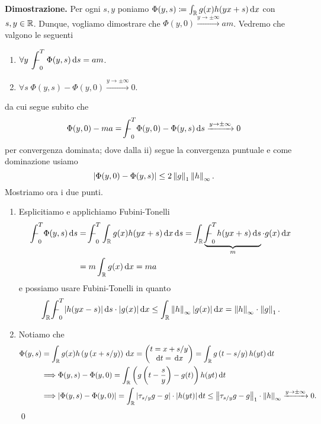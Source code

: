 \textbf{Dimostrazione.}
Per ogni $s, y$ poniamo $\Phi(y, s) \coloneqq \int_\mathbb R g(x) h(yx + s) \,\mathrm{d} x$ con $s, y \in \mathbb R$. Dunque, vogliamo dimostrare che $\Phi(y, 0) \xrightarrow{y \to \pm\infty} a m$.
Vedremo che valgono le seguenti
\begin{enumerate}
	\item $\forall y \; \ds \avint_0^T \Phi(y, s) \dd s = am$.
	\item $\forall s \; \Phi(y, s) - \Phi(y, 0) \xrightarrow{y \to \pm \infty} 0$.
\end{enumerate}
da cui segue subito che
$$
\Phi(y, 0) - ma = \avint_0^T \Phi(y, 0) - \Phi(y, s) \dd s \xrightarrow{y \to \pm \infty} 0
$$
per convergenza dominata; dove dalla ii) segue la convergenza puntuale e come dominazione usiamo
$$
	|\Phi(y, 0) - \Phi(y, s)| \leq 2 \left\lVert g \right\rVert_1 \left\lVert h \right\rVert_\infty.
$$
Mostriamo ora i due punti.
\begin{enumerate}
	\item Esplicitiamo e applichiamo Fubini-Tonelli
		$$
		\begin{aligned}
			\avint_0^T \Phi(y, s) \dd s
			&= \avint_0^T \int_\R g(x) h(yx + s) \dd x \dd s
			= \int_\R \underbrace{\avint_0^T h(yx + s) \dd s}_m \cdot g(x) \dd x \\
			&= m \int_\R g(x) \dd x = m a
		\end{aligned}
		$$
		e possiamo usare Fubini-Tonelli in quanto 
		$$
			\ds \int_\R \avint_0^T |h(yx - s)| \dd s \cdot |g(x)| \dd x \leq \int_\R \norm{h}_\infty |g(x)| \dd x = \norm{h}_\infty \cdot \norm{g}_1.
		$$

	\item Notiamo che
		\begin{align*}
			\Phi(y, s) 
			& = \int_\mathbb R g(x) h\left(y \left( x + s/y \right)\right) \,\mathrm{d} x
			= \begin{pmatrix}
				t = x + s/y \\
				\,\mathrm{d} t = \,\mathrm{d} x
			\end{pmatrix} 
			= \int_\mathbb R g \left( t - s/y \right) h(yt) \,\mathrm{d} t \\
			& \Longrightarrow \Phi(y, s) - \Phi(y, 0) = \int_\mathbb R \left(g\left( t - \frac{s}{y}\right) - g(t) \right) h(yt) \,\mathrm{d} t \\
			& \Longrightarrow 
			|\Phi(y, s) - \Phi(y, 0)| = \int_\mathbb R |\tau_{s/y} g - g| \cdot |h(yt)| \,\mathrm{d} t
			\leq \left\lVert \tau_{s/y} g - g \right\rVert_1 \cdot \left\lVert h \right\rVert_\infty \xrightarrow{y \to \pm \infty} 0.
		\end{align*}
\qed
\end{enumerate}

